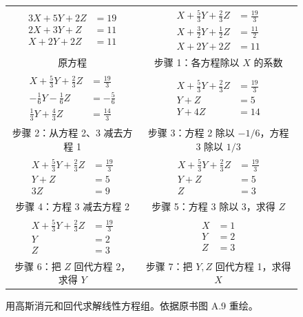 \begin{figure}[htbp]
  \centering
  \scriptsize
  \renewcommand{\arraystretch}{1.15}
  \begin{tabular}{c@{\ $\Longrightarrow$\ }c}
    $\begin{aligned}3X+5Y+2Z&=19\\2X+3Y+Z&=11\\X+2Y+2Z&=11\end{aligned}$
      & $\begin{aligned}X+\frac53Y+\frac23Z&=\frac{19}3\\X+\frac32Y+\frac12Z&=\frac{11}2\\X+2Y+2Z&=11\end{aligned}$\\
    原方程 & 步骤 1：各方程除以 $X$ 的系数\\[0.7em]
    $\begin{aligned}X+\frac53Y+\frac23Z&=\frac{19}3\\-\frac16Y-\frac16Z&=-\frac56\\\frac13Y+\frac43Z&=\frac{14}3\end{aligned}$
      & $\begin{aligned}X+\frac53Y+\frac23Z&=\frac{19}3\\Y+Z&=5\\Y+4Z&=14\end{aligned}$\\
    步骤 2：从方程 2、3 减去方程 1 & 步骤 3：方程 2 除以 $-1/6$，方程 3 除以 $1/3$\\[0.7em]
    $\begin{aligned}X+\frac53Y+\frac23Z&=\frac{19}3\\Y+Z&=5\\3Z&=9\end{aligned}$
      & $\begin{aligned}X+\frac53Y+\frac23Z&=\frac{19}3\\Y+Z&=5\\Z&=3\end{aligned}$\\
    步骤 4：方程 3 减去方程 2 & 步骤 5：方程 3 除以 3，求得 $Z$\\[0.7em]
    $\begin{aligned}X+\frac53Y+\frac23Z&=\frac{19}3\\Y&=2\\Z&=3\end{aligned}$
      & $\begin{aligned}X&=1\\Y&=2\\Z&=3\end{aligned}$\\
    步骤 6：把 $Z$ 回代方程 2，求得 $Y$ & 步骤 7：把 $Y,Z$ 回代方程 1，求得 $X$
  \end{tabular}
  \caption{用高斯消元和回代求解线性方程组。依据原书图 A.9 重绘。}
  \label{fig:a-9}
\end{figure}

